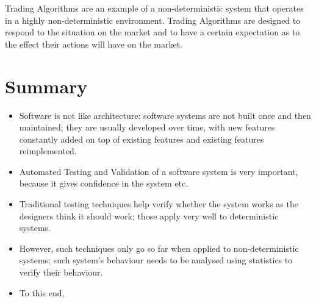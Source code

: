 Trading Algorithms are an example of a non-deterministic system that operates in a highly non-deterministic environment. Trading Algorithms are designed to respond to the situation on the market and to have a certain expectation as to the effect their actions will have on the market.


\pagebreak

\section{Summary}
\begin{itemize}
\item Software is not like architecture: software systems are not built once and then maintained; they are usually developed over time, with new features constantly added on top of existing features and existing features reimplemented.
\item Automated Testing and Validation of a software system is very important, because it gives confidence in the system etc.
\item Traditional testing techniques help verify whether the system works as the designers think it should work; those apply very well to deterministic systems.
\item However, such techniques only go so far when applied to non-deterministic systems; such system's behaviour needs to be analysed using statistics to verify their behaviour.
\item To this end, 
\end{itemize}